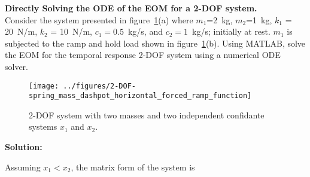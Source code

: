 \documentclass[12pt,letter]{article}
\begin{document}
			

	
	\begin{example}
	\textbf{Directly Solving the ODE of the EOM for a 2-DOF system.} \\

	\noindent Consider the system presented in figure~\ref{fig:2-DOF-spring_mass_dashpot_horizontal_forced_ramp_function}(a) where $m_1$=2~kg, $m_2$=1~kg, $k_1$ = 20~N/m, $k_2$ = 10~N/m, $c_1=0.5$~kg/s, and $c_2=1$~kg/s; initially at rest. $m_1$ is subjected to the ramp and hold load shown in figure~\ref{fig:2-DOF-spring_mass_dashpot_horizontal_forced_ramp_function}(b). 	Using MATLAB, solve the EOM for the temporal response 2-DOF system using a numerical ODE solver.

			\begin{figure}[H]
				\centering
				\texttt{[image: ../figures/2-DOF-spring\_mass\_dashpot\_horizontal\_forced\_ramp\_function]}
				\caption{2-DOF system with two masses and two independent confidante systems $x_1$ and $x_2$.}
				\label{fig:2-DOF-spring_mass_dashpot_horizontal_forced_ramp_function}
			\end{figure}
			
			
\noindent \textbf{Solution:} 
	
\noindent Assuming $x_1<x_2$, the matrix form of the system is
	

\end{example}
\end{document}
